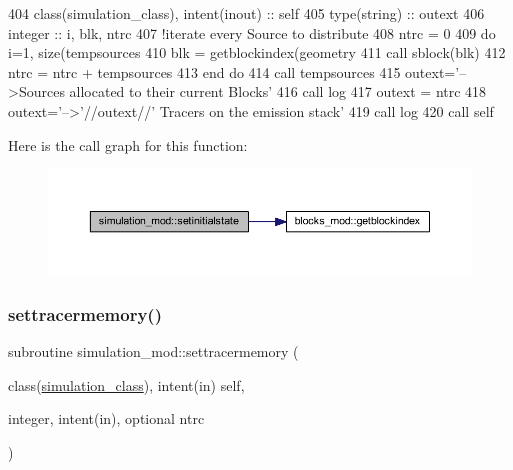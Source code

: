 \begin{DoxyCode}
404     \textcolor{keywordtype}{class}(simulation\_class), \textcolor{keywordtype}{intent(inout)} :: self
405     \textcolor{keywordtype}{type}(string) :: outext
406     \textcolor{keywordtype}{integer} :: i, blk, ntrc
407     \textcolor{comment}{!iterate every Source to distribute}
408     ntrc = 0
409     \textcolor{keywordflow}{do} i=1, \textcolor{keyword}{size}(tempsources%
410         blk = getblockindex(geometry%
411         \textcolor{keyword}{call }sblock(blk)%
412         ntrc = ntrc + tempsources%
413 \textcolor{keywordflow}{    end do}
414     \textcolor{keyword}{call }tempsources%
415     outext=\textcolor{stringliteral}{'-->Sources allocated to their current Blocks'}
416     \textcolor{keyword}{call }log%
417     outext = ntrc
418     outext=\textcolor{stringliteral}{'-->'}//outext//\textcolor{stringliteral}{' Tracers on the emission stack'}
419     \textcolor{keyword}{call }log%
420     \textcolor{keyword}{call }self%
\end{DoxyCode}
Here is the call graph for this function\+:\nopagebreak
\begin{figure}[H]
\begin{center}
\leavevmode
\includegraphics[width=350pt]{namespacesimulation__mod_a447c6d709de6aa360a65d39d660e627b_cgraph}
\end{center}
\end{figure}
\mbox{\label{namespacesimulation__mod_acc5fa823c8dd599de8feda8988c224f2}} 
\subsubsection{\texorpdfstring{settracermemory()}{settracermemory()}}
{\footnotesize\ttfamily subroutine simulation\+\_\+mod\+::settracermemory (\begin{DoxyParamCaption}\item[{class(\mbox{\hyperlink{structsimulation__mod_1_1simulation__class}{simulation\+\_\+class}}), intent(in)}]{self,  }\item[{integer, intent(in), optional}]{ntrc }\end{DoxyParamCaption})\hspace{0.3cm}{\ttfamily [private]}}



